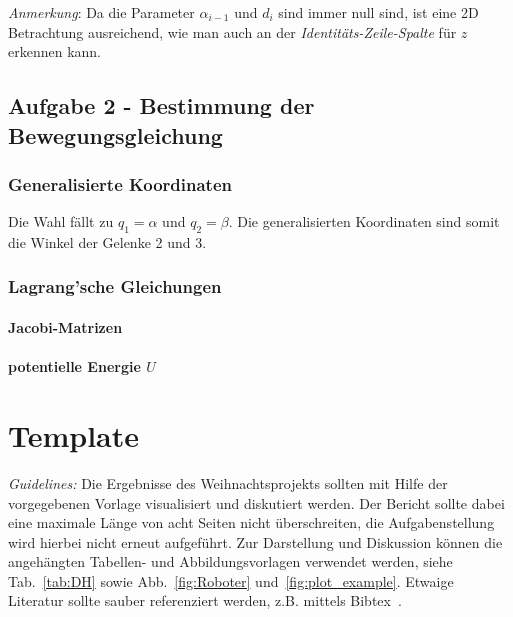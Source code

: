 \documentclass{MSM_latex}
\begin{document}
\textit{Anmerkung}: Da die Parameter $\alpha_{i-1}$ und $d_i$ sind immer null sind, ist eine 2D Betrachtung ausreichend, wie man auch an der \emph{Identitäts-Zeile-Spalte} für $z$ erkennen kann.

\subsection*{Aufgabe 2 - Bestimmung der Bewegungsgleichung}

\subsubsection*{Generalisierte Koordinaten}
Die Wahl fällt zu $q_1 = \alpha$ und $q_2 = \beta$. Die generalisierten Koordinaten sind somit die Winkel der Gelenke 2 und 3.

\subsubsection*{Lagrang'sche Gleichungen}

\paragraph*{Jacobi-Matrizen}



\paragraph*{potentielle Energie $U$}



\newpage




\section*{Template}


\textit{Guidelines:} Die Ergebnisse des Weihnachtsprojekts sollten mit Hilfe der vorgegebenen Vorlage  visualisiert und diskutiert werden. 
Der Bericht sollte dabei eine maximale Länge von acht Seiten nicht überschreiten, die Aufgabenstellung wird hierbei nicht erneut aufgeführt. 
Zur Darstellung und Diskussion können die angehängten Tabellen- und Abbildungsvorlagen verwendet werden, siehe Tab.~\ref{tab:DH} sowie Abb.~\ref{fig:Roboter} und~\ref{fig:plot_example}. 
Etwaige Literatur sollte sauber referenziert werden, z.B. mittels Bibtex~\cite{FehrSchmidSchneiderEberhard20,Fuchs23, DenavitHartenberg55,Lipkin05}.
\end{document}

